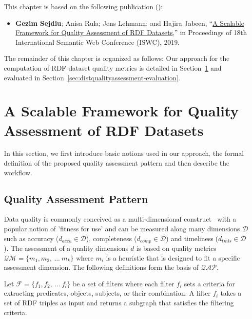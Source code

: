 This chapter is based on the following publication (\cite{sejdiu-2019-sansa-dist-quality-assessment-iswc}):
\begin{itemize}
     \item \textbf{Gezim Sejdiu}; Anisa Rula; Jens Lehmann; and Hajira Jabeen, “\href{http://jens-lehmann.org/files/2019/iswc_dist_quality_assessment.pdf}{A Scalable Framework for Quality Assessment of RDF Datasets},” in Proceedings of 18th International Semantic Web Conference (ISWC), 2019.
\end{itemize}

The remainder of this chapter is organized as follows:
Our approach for the computation of RDF dataset quality metrics is detailed in Section~\ref{sec:distqualityassessment-approach} and evaluated in Section~\ref{sec:distqualityassessment-evaluation}.

\section{A Scalable Framework for Quality Assessment of RDF Datasets}
\label{sec:distqualityassessment-approach}
In this section, we first introduce basic notions used in our approach, the formal definition of the proposed quality assessment pattern and then describe the workflow. 

\subsection{Quality Assessment Pattern}
Data quality is commonly conceived as a multi-dimensional construct~\cite{BatiniS16} with a popular notion of 'fitness for use' and can be measured along many dimensions $\mathcal{D}$ such as accuracy ($d_{accu} \in \mathcal{D}$), completeness ($d_{comp} \in \mathcal{D}$) and timeliness ($d_{tmls} \in \mathcal{D}$). 
The assessment of a quality dimensions $d$ is based on quality metrics $\mathcal{QM} = \{m_1,m_2,~\dots~m_k\}$ where $m_i$ is a heuristic that is designed to fit a specific assessment dimension. 
The following definitions form the basis of $\mathcal{QAP}$.

\begin{definition}[Filter]
Let $\mathcal{F} = \{f_1,f_2,~\dots~f_l\}$ be a set of filters where each filter $f_i$ sets a criteria for extracting predicates, objects, subjects, or their combination.
A filter $f_i$ takes a set of RDF triples as input and returns a subgraph that satisfies the filtering criteria.
\end{definition}

